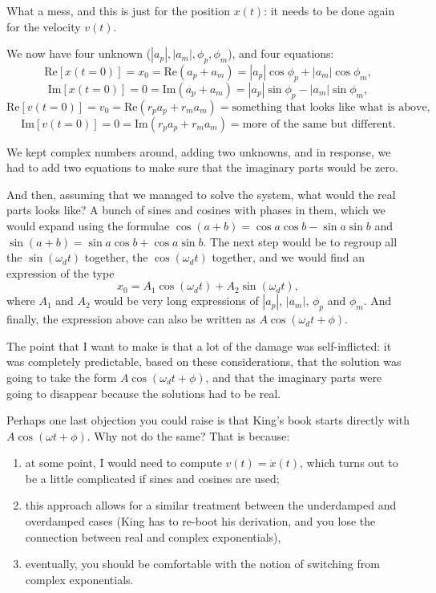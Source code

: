 \documentclass[11pt]{article}
\providecommand{\tightlist}{%
      \setlength{\itemsep}{0pt}\setlength{\parskip}{0pt}}
\begin{document}
What a mess, and this is just for the position \(x(t)\): it needs to be
done again for the velocity \(v(t)\).

We now have four unknown (\(|a_p|, |a_m|, \phi_p, \phi_m\)), and four
equations:
\[\textrm{Re}[x(t=0)] = x_0 = \textrm{Re}(a_p + a_m) = |a_p|\cos\phi_p + |a_m|\cos\phi_m, \]
\[\textrm{Im}[x(t=0)] = 0 = \textrm{Im}(a_p + a_m) = |a_p|\sin\phi_p - |a_m|\sin\phi_m, \]
\[\textrm{Re}[v(t=0)] = v_0 = \textrm{Re}(r_p a_p + r_m a_m) = \textrm{something that looks like what is above}, \]
\[\textrm{Im}[v(t=0)] = 0 = \textrm{Im}(r_p a_p + r_m a_m) = \textrm{more of the same but different}. \]

We kept complex numbers around, adding two unknowns, and in response, we
had to add two equations to make sure that the imaginary parts would be
zero.

And then, assuming that we managed to solve the system, what would the
real parts looks like? A bunch of sines and cosines with phases in them,
which we would expand using the formulae
\(\cos(a+b) = \cos a\cos b - \sin a \sin b\) and
\(\sin(a+b) = \sin a\cos b + \cos a \sin b\). The next step would be to
regroup all the \(\sin(\omega_dt)\) together, the \(\cos(\omega_d t)\)
together, and we would find an expression of the type
\[ x_0 = A_1 \cos(\omega_dt) + A_2 \sin(\omega_d t), \] where \(A_1\)
and \(A_2\) would be very long expressions of \(|a_p|\), \(|a_m|\),
\(\phi_p\) and \(\phi_m\). And finally, the expression above can also be
written as \(A\cos(\omega_d t + \phi)\).

The point that I want to make is that a lot of the damage was
self-inflicted: it was completely predictable, based on these
considerations, that the solution was going to take the form
\(A\cos(\omega_dt + \phi)\), and that the imaginary parts were going to
disappear because the solutions had to be real.

Perhaps one last objection you could raise is that King's book starts
directly with \(A \cos(\omega t + \phi)\). Why not do the same? That is
because:

\begin{enumerate}
\def\labelenumi{\arabic{enumi}.}
\tightlist
\item
  at some point, I would need to compute \(v(t) = \dot x(t)\), which
  turns out to be a little complicated if sines and cosines are used;
\item
  this approach allows for a similar treatment between the underdamped
  and overdamped cases (King has to re-boot his derivation, and you lose
  the connection between real and complex exponentials),
\item
  eventually, you should be comfortable with the notion of switching
  from complex exponentials.
\end{enumerate}
\end{document}
